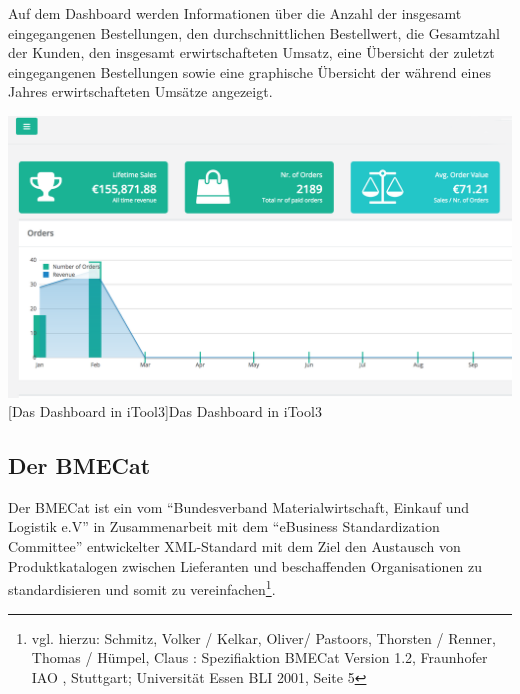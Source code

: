 	Auf dem Dashboard werden Informationen über die Anzahl der insgesamt eingegangenen Bestellungen, den durchschnittlichen Bestellwert, die Gesamtzahl der Kunden, den insgesamt erwirtschafteten Umsatz, eine Übersicht der zuletzt eingegangenen Bestellungen sowie eine graphische Übersicht der während eines Jahres erwirtschafteten Umsätze angezeigt. \\
	\begin{minipage}{\linewidth}
		\vspace{1em}
		\centering
		\includegraphics[width=0.8 \linewidth]{img/Dashboard}
		[Das Dashboard in iTool3]{Das Dashboard in iTool3}
		\label{fig:header}
		\vspace{1em}
	\end{minipage}
	
	\pagebreak
	\subsection{Der BMECat} %
	
	Der BMECat ist ein vom \enquote{Bundesverband Materialwirtschaft, Einkauf und Logistik e.V} in Zusammenarbeit mit dem \enquote{eBusiness Standardization Committee} entwickelter XML-Standard mit dem Ziel den Austausch von Produktkatalogen zwischen Lieferanten und beschaffenden Organisationen zu standardisieren und somit zu vereinfachen\footnote{vgl. hierzu: Schmitz, Volker /  Kelkar, Oliver/ Pastoors, Thorsten / Renner, Thomas  / Hümpel, Claus : Spezifiaktion BMECat Version 1.2, Fraunhofer IAO , Stuttgart; Universität Essen BLI 2001, Seite 5}. 
	

